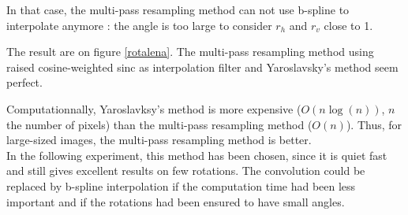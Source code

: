 	In that case, the multi-pass resampling method can not use b-spline to interpolate anymore : the angle is too large to consider $r_h$ and $r_v$ close to 1.
	

	The result are on figure \ref{rotalena}. The multi-pass resampling method using raised cosine-weighted sinc as interpolation filter and Yaroslavsky's method seem perfect.


	Computationnally, Yaroslavksy's method is more expensive ($O(n \log(n))$, $n$ the number of pixels) than the multi-pass resampling method ($O(n)$). Thus, for large-sized images, the multi-pass resampling method is better.\\

	In the following experiment, this method has been chosen, since it is quiet fast and still gives excellent results on few rotations.
	The convolution could be replaced by b-spline interpolation if the computation time had been less important and if the rotations had been ensured to have small angles.

